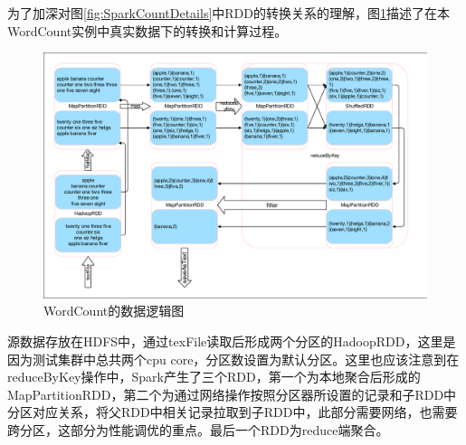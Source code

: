 为了加深对图\ref{fig:SparkCountDetails}中RDD的转换关系的理解，图\ref{fig:wordcountdatastream}描述了在本WordCount实例中真实数据下的转换和计算过程。
\begin{figure}[H] 
	\centering
	\includegraphics[width=\textwidth]{figures/wordcountdatastream.pdf}
	\caption{WordCount的数据逻辑图}
	\label{fig:wordcountdatastream}
\end{figure}

源数据存放在HDFS中，通过texFile读取后形成两个分区的HadoopRDD，这里是因为测试集群中总共两个cpu core，分区数设置为默认分区。这里也应该注意到在reduceByKey操作中，Spark产生了三个RDD，第一个为本地聚合后形成的MapPartitionRDD，第二个为通过网络操作按照分区器所设置的记录和子RDD中分区对应关系，将父RDD中相关记录拉取到子RDD中，此部分需要网络，也需要跨分区，这部分为性能调优的重点。最后一个RDD为reduce端聚合。